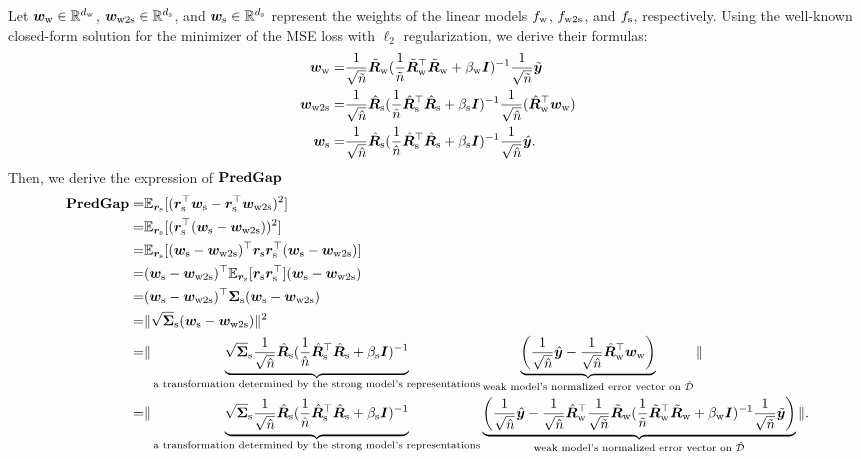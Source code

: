Let ${\bm{w}}_{\text{w}} \in {\mathbb{R}}^{d_{\text{w}}}$, ${\bm{w}}_{\text{w2s}} \in {\mathbb{R}}^{d_{\text{s}}}$, and ${\bm{w}}_{\text{s}} \in {\mathbb{R}}^{d_{\text{s}}}$ represent the weights of the linear models $f_{\text{w}}$, $f_{\text{w2s}}$, and $f_{\text{s}}$, respectively. Using the well-known closed-form solution for the minimizer of the MSE loss with $\ell_2$ regularization, we derive their formulas:
\begin{align}
    \nonumber
    {\bm{w}}_{\text{w}} = & \frac{1}{\sqrt{\tilde{n}}}\tilde{{\bm{R}}}_{\text{w}} (\frac{1}{\tilde{n}}\tilde{{\bm{R}}}_{\text{w}}^\top \tilde{{\bm{R}}}_{\text{w}} + \beta_{\text{w}}{\bm{I}} )^{-1}\frac{1}{\sqrt{\tilde{n}}}\tilde{{\bm{y}}} \\
    \label{eq: exp_wtos}
    {\bm{w}}_{\text{w2s}} = &  \frac{1}{\sqrt{\hat{n}}}\hat{{\bm{R}}}_{\text{s}} ( \frac{1}{\hat{n}}\hat{{\bm{R}}}_{\text{s}}^\top \hat{{\bm{R}}}_{\text{s}} +\beta_{\text{s}} {\bm{I}} )^{-1} \frac{1}{\sqrt{\hat{n}}} ( \hat{{\bm{R}}}_{\text{w}}^\top {\bm{w}}_{\text{w}})\\
    \nonumber
    {\bm{w}}_{\text{s}} = & \frac{1}{\sqrt{\hat{n}}}\hat{{\bm{R}}}_{\text{s}} ( \frac{1}{\hat{n}}\hat{{\bm{R}}}_{\text{s}}^\top \hat{{\bm{R}}}_{\text{s}} +\beta_{\text{s}} {\bm{I}} )^{-1} \frac{1}{\sqrt{\hat{n}}} \hat{{\bm{y}}}.
\end{align}
Then, we derive the expression of $\textbf{PredGap}{}$
\begin{align}
    \nonumber
    \textbf{PredGap}{} = & \mathbb{E}_{{\bm{r}}_{\text{s}}}[ ({\bm{r}}_{\text{s}}^\top{\bm{w}}_{\text{s}} - {\bm{r}}_{\text{s}}^\top{\bm{w}}_{\text{w2s}})^2 ]\\
    = & \mathbb{E}_{{\bm{r}}_{\text{s}}}[ ({\bm{r}}_{\text{s}}^\top({\bm{w}}_{\text{s}} - {\bm{w}}_{\text{w2s}}))^2 ]\\
    \nonumber
    = & \mathbb{E}_{{\bm{r}}_{\text{s}}}[({\bm{w}}_{\text{s}} - {\bm{w}}_{\text{w2s}})^\top {\bm{r}}_{\text{s}}{\bm{r}}_{\text{s}}^\top({\bm{w}}_{\text{s}} - {\bm{w}}_{\text{w2s}}) ] \\
    \nonumber
    = &  ({\bm{w}}_{\text{s}} - {\bm{w}}_{\text{w2s}})^\top \mathbb{E}_{{\bm{r}}_{\text{s}}}[{\bm{r}}_{\text{s}}{\bm{r}}_{\text{s}}^\top]({\bm{w}}_{\text{s}} - {\bm{w}}_{\text{w2s}})\\
    \nonumber
    = & ({\bm{w}}_{\text{s}} - {\bm{w}}_{\text{w2s}})^\top{\bm{\Sigma}}_{\text{s}} ({\bm{w}}_{\text{s}} - {\bm{w}}_{\text{w2s}})\\
    \nonumber
    = & \| \sqrt{{\bm{\Sigma}}}_{\text{s}} ({\bm{w}}_{\text{s}} - {\bm{w}}_{\text{w2s}}) \|^2\\
    \nonumber
    = & \| \underbrace{ \sqrt{{\bm{\Sigma}}}_{\text{s}} \frac{1}{\sqrt{\hat{n}}}\hat{{\bm{R}}}_{\text{s}} ( \frac{1}{\hat{n}}\hat{{\bm{R}}}_{\text{s}}^\top \hat{{\bm{R}}}_{\text{s}} +\beta_{\text{s}} {\bm{I}} )^{-1} }_{\text{a transformation determined by the strong model's representations}} \underbrace{\left( \frac{1}{\sqrt{\hat{n}}} \hat{{\bm{y}}} -  \frac{1}{\sqrt{\hat{n}}}\hat{{\bm{R}}}_{\text{w}}^\top {\bm{w}}_{\text{w}} \right) }_{\text{weak model's normalized error vector on $\hat{{\mathcal{D}}}$}}\| \\
    \label{eq: expression_predgap}
    = & \|  \underbrace{\sqrt{{\bm{\Sigma}}}_{\text{s}} \frac{1}{\sqrt{\hat{n}}}\hat{{\bm{R}}}_{\text{s}} ( \frac{1}{\hat{n}}\hat{{\bm{R}}}_{\text{s}}^\top \hat{{\bm{R}}}_{\text{s}} +\beta_{\text{s}} {\bm{I}} )^{-1} }_{\text{a transformation determined by the strong model's representations}}\underbrace{\left( \frac{1}{\sqrt{\hat{n}}} \hat{{\bm{y}}} -  
\frac{1}{\sqrt{\hat{n}}}\hat{{\bm{R}}}_{\text{w}}^\top \frac{1}{\sqrt{\tilde{n}}}\tilde{{\bm{R}}}_{\text{w}} (\frac{1}{\tilde{n}}\tilde{{\bm{R}}}_{\text{w}}^\top \tilde{{\bm{R}}}_{\text{w}} + \beta_{\text{w}}{\bm{I}} )^{-1}\frac{1}{\sqrt{\tilde{n}}}\tilde{{\bm{y}}} \right) }_{\text{weak model's normalized error vector on $\hat{{\mathcal{D}}}$}} \|.
\end{align}
